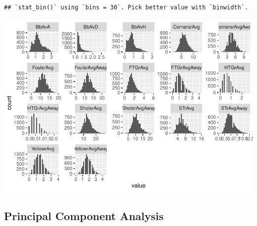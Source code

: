 \documentclass[
]{article}
\newenvironment{Shaded}{\begin{snugshade}}{\end{snugshade}}
\newcommand{\CommentTok}[1]{\textcolor[rgb]{0.56,0.35,0.01}{\textit{#1}}}
\newcommand{\DataTypeTok}[1]{\textcolor[rgb]{0.13,0.29,0.53}{#1}}
\newcommand{\DecValTok}[1]{\textcolor[rgb]{0.00,0.00,0.81}{#1}}
\newcommand{\KeywordTok}[1]{\textcolor[rgb]{0.13,0.29,0.53}{\textbf{#1}}}
\newcommand{\NormalTok}[1]{#1}
\newcommand{\OperatorTok}[1]{\textcolor[rgb]{0.81,0.36,0.00}{\textbf{#1}}}
\newcommand{\OtherTok}[1]{\textcolor[rgb]{0.56,0.35,0.01}{#1}}
\newcommand{\StringTok}[1]{\textcolor[rgb]{0.31,0.60,0.02}{#1}}
\begin{document}
\begin{Shaded}
\end{Shaded}

\begin{verbatim}
## `stat_bin()` using `bins = 30`. Pick better value with `binwidth`.
\end{verbatim}

\begin{center}\includegraphics{EPL_Model_files/figure-latex/unnamed-chunk-6-2} \end{center}

\hypertarget{principal-component-analysis}{%
\subsection{Principal Component
Analysis}\label{principal-component-analysis}}
\end{document}
